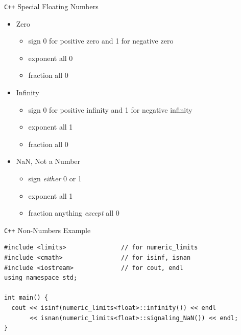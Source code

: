 \documentclass[presentation]{beamer}
\begin{document}
\begin{frame}[fragile,label={sec:orgheadline9}]{\texttt{C++} Special Floating Numbers}
 \begin{itemize}
\item Zero
\begin{itemize}
\item sign 0 for positive zero and 1 for negative zero
\item exponent all 0
\item fraction all 0
\end{itemize}
\item Infinity
\begin{itemize}
\item sign 0 for positive infinity and 1 for negative infinity
\item exponent all 1
\item fraction all 0
\end{itemize}
\item NaN, Not a Number
\begin{itemize}
\item sign \emph{either} 0 or 1
\item exponent all 1
\item fraction anything \emph{except} all 0
\end{itemize}
\end{itemize}
\end{frame}

\begin{frame}[fragile,label={sec:orgheadline10}]{\texttt{C++} Non-Numbers Example}
 \begin{verbatim}
#include <limits>               // for numeric_limits
#include <cmath>                // for isinf, isnan
#include <iostream>             // for cout, endl
using namespace std;

int main() {
  cout << isinf(numeric_limits<float>::infinity()) << endl
       << isnan(numeric_limits<float>::signaling_NaN()) << endl;
}
\end{verbatim}
\end{frame}
\end{document}

